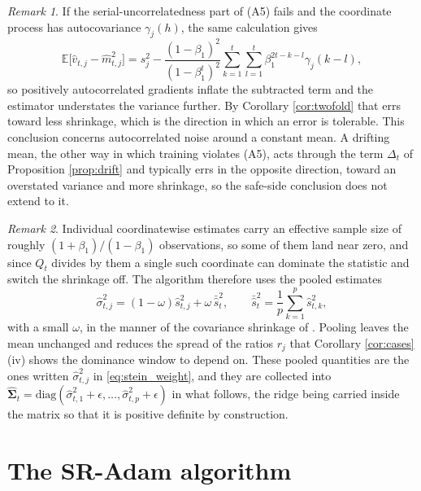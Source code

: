 \documentclass[a4paper,fleqn]{cas-dc}
\theoremstyle{plain}
\theoremstyle{definition}
\theoremstyle{remark}
\newtheorem{remark}{Remark}
\newcommand{\rev}[1]{#1}
\newcommand{\diag}{\mathrm{diag}}
\newcommand{\E}{\mathbb{E}}
\begin{document}
\begin{remark}
\label{rem:a5}
If the serial-uncorrelatedness part of (A5) fails and the coordinate process has autocovariance $\gamma_j(h)$, the same calculation gives
\begin{equation}
\E\bigl[\hat v_{t,j}-\hat m^2_{t,j}\bigr]
=
s^2_j-\frac{(1-\beta_1)^2}{(1-\beta_1^{t})^{2}}\sum_{k=1}^{t}\sum_{l=1}^{t}\beta_1^{2t-k-l}\gamma_j(k-l),
\end{equation}
so positively autocorrelated gradients inflate the subtracted term and the estimator understates the variance further. By Corollary \ref{cor:twofold} that errs toward less shrinkage, which is the direction in which an error is tolerable. \rev{This conclusion concerns autocorrelated noise around a constant mean. A drifting mean, the other way in which training violates (A5), acts through the term $\Delta_t$ of Proposition \ref{prop:drift} and typically errs in the opposite direction, toward an overstated variance and more shrinkage, so the safe-side conclusion does not extend to it.}
\end{remark}

\begin{remark}
\label{rem:pooling}
Individual coordinatewise estimates carry an effective sample size of roughly $(1+\beta_1)/(1-\beta_1)$ observations, so some of them land near zero, and since $Q_t$ divides by them a single such coordinate can dominate the statistic and switch the shrinkage off. The algorithm therefore uses the pooled estimates
\begin{equation}
\label{eq:pooled}
\hat\sigma^2_{t,j}=(1-\omega)\hat s^2_{t,j}+\omega\,\bar{\hat s}^2_t,
\qquad
\bar{\hat s}^2_t=\frac1p\sum_{k=1}^{p}\hat s^2_{t,k},
\end{equation}
with a small $\omega$, in the manner of the covariance shrinkage of \citet{ledoit2004}. Pooling leaves the mean unchanged and reduces the spread of the ratios $r_j$ that Corollary \ref{cor:cases}(iv) shows the dominance window to depend on. These pooled quantities are the ones written $\hat\sigma^2_{t,j}$ in \eqref{eq:stein_weight}, and they are collected into $\widehat{\bm\Sigma}_t=\diag(\hat\sigma^2_{t,1}+\epsilon,\dots,\hat\sigma^2_{t,p}+\epsilon)$ in what follows, the ridge being carried inside the matrix so that it is positive definite by construction.
\end{remark}

\section{The SR-Adam algorithm}
\label{sec:algorithm}
\end{document}

